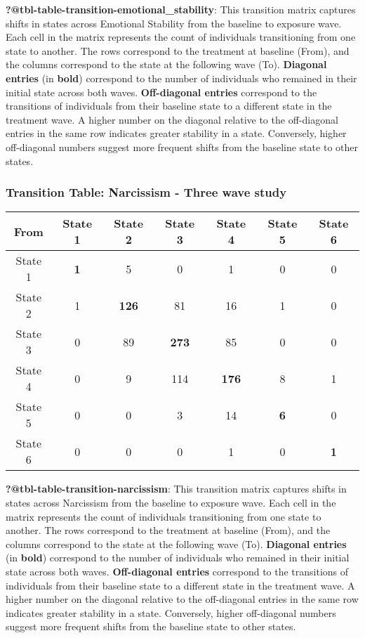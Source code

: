 \documentclass[
  singlecolumn]{article}
\begin{document}
\textbf{?@tbl-table-transition-emotional\_stability}: This transition
matrix captures shifts in states across Emotional Stability from the
baseline to exposure wave. Each cell in the matrix represents the count
of individuals transitioning from one state to another. The rows
correspond to the treatment at baseline (From), and the columns
correspond to the state at the following wave (To). \textbf{Diagonal
entries} (in \textbf{bold}) correspond to the number of individuals who
remained in their initial state across both waves. \textbf{Off-diagonal
entries} correspond to the transitions of individuals from their
baseline state to a different state in the treatment wave. A higher
number on the diagonal relative to the off-diagonal entries in the same
row indicates greater stability in a state. Conversely, higher
off-diagonal numbers suggest more frequent shifts from the baseline
state to other states.

\subsubsection{Transition Table: Narcissism - Three wave
study}\label{transition-table-narcissism---three-wave-study}

\begin{longtable}[]{@{}ccccccc@{}}
\toprule\noalign{}
From & State 1 & State 2 & State 3 & State 4 & State 5 & State 6 \\
\midrule\noalign{}
\endhead
\bottomrule\noalign{}
\endlastfoot
State 1 & \textbf{1} & 5 & 0 & 1 & 0 & 0 \\
State 2 & 1 & \textbf{126} & 81 & 16 & 1 & 0 \\
State 3 & 0 & 89 & \textbf{273} & 85 & 0 & 0 \\
State 4 & 0 & 9 & 114 & \textbf{176} & 8 & 1 \\
State 5 & 0 & 0 & 3 & 14 & \textbf{6} & 0 \\
State 6 & 0 & 0 & 0 & 1 & 0 & \textbf{1} \\
\end{longtable}

\textbf{?@tbl-table-transition-narcissism}: This transition matrix
captures shifts in states across Narcissism from the baseline to
exposure wave. Each cell in the matrix represents the count of
individuals transitioning from one state to another. The rows correspond
to the treatment at baseline (From), and the columns correspond to the
state at the following wave (To). \textbf{Diagonal entries} (in
\textbf{bold}) correspond to the number of individuals who remained in
their initial state across both waves. \textbf{Off-diagonal entries}
correspond to the transitions of individuals from their baseline state
to a different state in the treatment wave. A higher number on the
diagonal relative to the off-diagonal entries in the same row indicates
greater stability in a state. Conversely, higher off-diagonal numbers
suggest more frequent shifts from the baseline state to other states.
\end{document}
